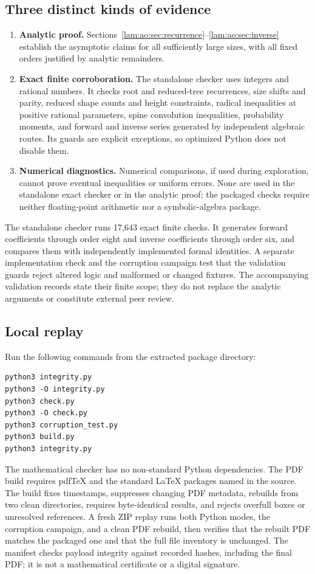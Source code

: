 \documentclass[11pt,a4paper]{article}
\numberwithin{equation}{section}
\theoremstyle{remark}
\begin{document}
\subsection{Three distinct kinds of evidence}
\begin{enumerate}
\item \textbf{Analytic proof.} Sections~\ref{lam:ao:sec:recurrence}--\ref{lam:ao:sec:inverse} establish the asymptotic claims for all sufficiently large sizes, with all fixed orders justified by analytic remainders.
\item \textbf{Exact finite corroboration.} The standalone checker uses integers and rational numbers. It checks root and reduced-tree recurrences, size shifts and parity, reduced shape counts and height constraints, radical inequalities at positive rational parameters, spine convolution inequalities, probability moments, and forward and inverse series generated by independent algebraic routes. Its guards are explicit exceptions, so optimized Python does not disable them.
\item \textbf{Numerical diagnostics.} Numerical comparisons, if used during exploration, cannot prove eventual inequalities or uniform errors. None are used in the standalone exact checker or in the analytic proof; the packaged checks require neither floating-point arithmetic nor a symbolic-algebra package.
\end{enumerate}

The standalone checker runs 17,643 exact finite checks. It generates forward coefficients through order eight and inverse coefficients through order six, and compares them with independently implemented formal identities. A separate implementation check and the corruption campaign test that the validation guards reject altered logic and malformed or changed fixtures. The accompanying validation records state their finite scope; they do not replace the analytic arguments or constitute external peer review.

\subsection{Local replay}
Run the following commands from the extracted package directory:
\begin{verbatim}
python3 integrity.py
python3 -O integrity.py
python3 check.py
python3 -O check.py
python3 corruption_test.py
python3 build.py
python3 integrity.py
\end{verbatim}
The mathematical checker has no non-standard Python dependencies. The PDF build requires pdfTeX and the standard LaTeX packages named in the source. The build fixes timestamps, suppresses changing PDF metadata, rebuilds from two clean directories, requires byte-identical results, and rejects overfull boxes or unresolved references. A fresh ZIP replay runs both Python modes, the corruption campaign, and a clean PDF rebuild, then verifies that the rebuilt PDF matches the packaged one and that the full file inventory is unchanged. The manifest checks payload integrity against recorded hashes, including the final PDF; it is not a mathematical certificate or a digital signature.
\end{document}
